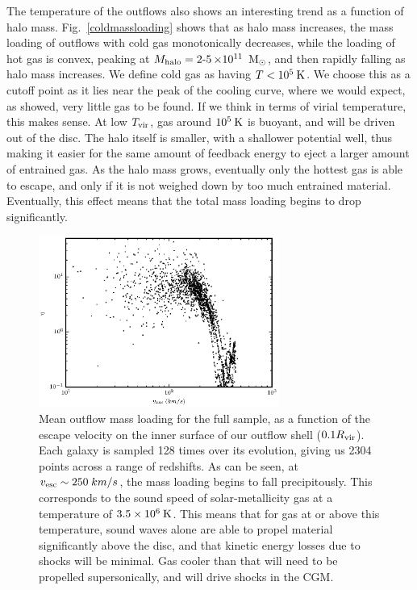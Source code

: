 The temperature of the outflows also shows an interesting trend as a function of
halo mass.  Fig.~\ref{coldmassloading} shows that as halo mass increases, the
mass loading of outflows with cold gas monotonically decreases, while the
loading of hot gas is convex, peaking at $M_{\rm halo} =
\operatorname{2-5}\times10^{11}\;\>{\rm M_{\odot}}$, and then rapidly falling as halo mass
increases.  We define cold gas as having $T<10^5\>{\rm K}$.  We choose this as a cutoff
point as it lies near the peak of the cooling curve, where we would expect, as
\citet{Woods2014} showed, very little gas to be found.  If we think in terms of
virial temperature, this makes sense.  At low $T_{\rm vir}$, gas around $10^5\>{\rm K}$ is
buoyant, and will be driven out of the disc.  The halo itself is smaller, with a
shallower potential well, thus making it easier for the same amount of feedback
energy to eject a larger amount of entrained gas.  As the halo mass grows,
eventually only the hottest gas is able to escape, and only if it is not weighed
down by too much entrained material.  Eventually, this effect means that the
total mass loading begins to drop significantly.
\begin{figure}
    \includegraphics[width=0.7\textwidth]{figures3/massloading_escape.eps}
    \caption[Mass loading vs. escape velocity of disc]{Mean outflow mass loading for the full sample, as a function of the
        escape velocity on the inner surface of our outflow shell
        ($0.1R_{\rm vir}$).  Each galaxy is sampled 128 times over its evolution,
        giving us 2304 points across a range of redshifts.  As can be seen, at
        $v_{\rm esc}\sim 250\;km/s$, the mass loading begins to fall precipitously.
        This corresponds to the sound speed of solar-metallicity gas at a
        temperature of $3.5\times10^{6}\>{\rm K}$.  This means that for gas at or
        above this temperature, sound waves alone are able to propel material
        significantly above the disc, and that kinetic energy losses due to
        shocks will be minimal.  Gas cooler than that will need to be propelled
        supersonically, and will drive shocks in the CGM.}
    \label{massloading_escape}
\end{figure}


